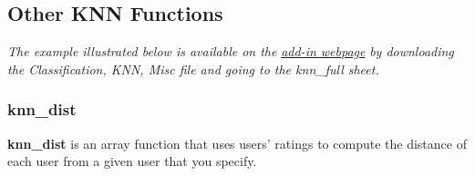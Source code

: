 \documentclass[12pt]{article}
\begin{document}












\subsection{Other KNN Functions}

\textit{The example illustrated below is available on the}  \href{https://www8.gsb.columbia.edu/bizanalytics/excel-add-in/multiplatform#h-4}{ \textit{add-in webpage}}
 \textit{by downloading the Classification, KNN, Misc file and going to the knn\_full sheet.}

\subsubsection{knn\_dist}

\textbf{knn\_dist} is an array function that uses users' ratings to compute the distance of each user from a given user that you specify.
\end{document}
